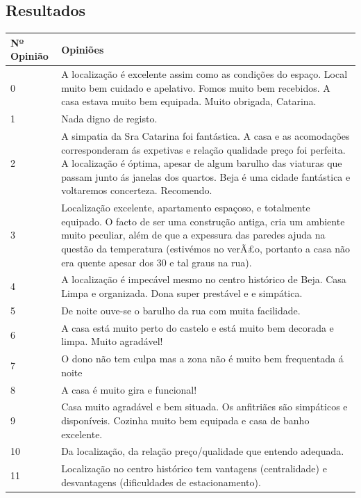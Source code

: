 \documentclass[a4paper,10pt]{article}
\begin{document}
\newpage

\subsection{Resultados}

\begin{table}[!ht]
  \centering
  \begin{tabular}{|p{}|p{}|}
  \hline
      Nº Opinião & Opiniões \\ \hline
      0 & A localização é excelente assim como as condições do espaço. Local muito bem cuidado e apelativo. Fomos muito bem recebidos. A casa estava muito bem equipada. Muito obrigada, Catarina. \\ \hline
      1 & Nada digno de registo. \\ \hline
      2 & A simpatia da Sra Catarina foi fantástica. A casa e as acomodações corresponderam ás expetivas e relação qualidade preço foi perfeita. A localização é óptima, apesar de algum barulho das viaturas que passam junto ás janelas dos quartos. Beja é uma cidade fantástica e voltaremos concerteza. Recomendo. \\ \hline
      3 & Localização excelente, apartamento espaçoso, e totalmente equipado.
      O facto de ser uma construção antiga, cria um ambiente muito peculiar, além de que a expessura das paredes ajuda na questão da temperatura (estivémos no verÃ£o, portanto a casa não era quente apesar dos 30 e tal graus na rua).
      \\ \hline
      4 & A localização é impecável mesmo no centro histórico de Beja. Casa Limpa e organizada. Dona super prestável e e simpática. \\ \hline
      5 & De noite ouve-se o barulho da rua com muita facilidade. \\ \hline
      6 & A casa está muito perto do castelo e está muito bem decorada e limpa. Muito agradável!  \\ \hline
      7 & O dono não tem culpa mas a zona não é muito bem frequentada á noite \\ \hline
      8 & A casa é muito gira e funcional! \\ \hline
      9 & Casa muito agradável e bem situada.  Os anfitriães são simpáticos e disponíveis. Cozinha muito bem equipada e casa de banho excelente. \\ \hline
      10 & Da localização, da relação preço/qualidade que entendo adequada.  \\ \hline
      11 & Localização no centro histórico tem vantagens (centralidade) e desvantagens (dificuldades de estacionamento). \\ \hline

\end{tabular}
\end{table}
\end{document}
